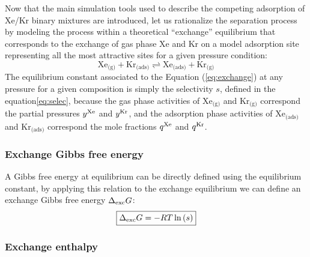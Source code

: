 \documentclass[main.tex]{subfiles}
\begin{document}
Now that the main simulation tools used to describe the competing adsorption of Xe/Kr binary mixtures are introduced, let us rationalize the separation process by modeling the process within a theoretical ``exchange'' equilibrium that corresponds to the exchange of gas phase Xe and Kr on a model adsorption site representing all the most attractive sites for a given pressure condition:
\begin{equation}\label{eq:exchange}
    \text{Xe}_{\text{(g)}} + \text{Kr}_{\text{(ads)}}
    \rightleftharpoons \text{Xe}_{\text{(ads)}} + \text{Kr}_{\text{(g)}}
\end{equation}
The equilibrium constant associated to the Equation (\ref{eq:exchange}) at any pressure for a given composition is simply the selectivity $s$, defined in the equation\ref{eq:selec}, because the gas phase activities of $\text{Xe}_{\text{(g)}}$ and $\text{Kr}_{\text{(g)}}$ correspond the partial pressures $y^{\text{Xe}}$ and $y^{\text{Kr}}$, and the adsorption phase activities of $\text{Xe}_{\text{(ads)}}$ and $\text{Kr}_{\text{(ads)}}$ correspond the mole fractions $q^{\text{Xe}}$ and $q^{\text{Kr}}$. 

\subsubsection{Exchange Gibbs free energy}

A Gibbs free energy at equilibrium can be directly defined using the equilibrium constant, by applying this relation to the exchange equilibrium we can define an exchange Gibbs free energy $\Delta_{\text{exc}}G$:
\begin{equation}\label{eq:exc_gibbs_free_energy}
  \boxed{
  \Delta_{\text{exc}}G = -RT \ln\left(s\right)
  }
\end{equation}

\subsubsection{Exchange enthalpy}
\end{document}
